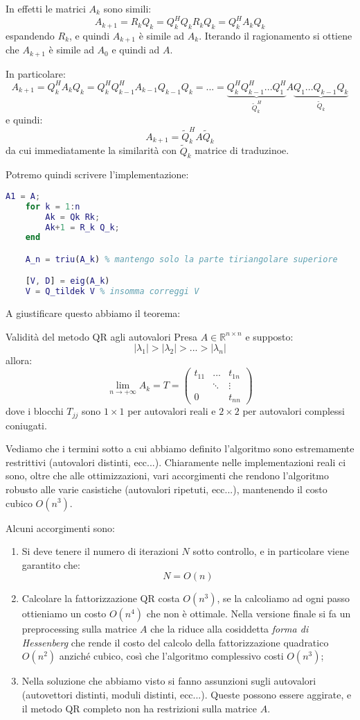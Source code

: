 \documentclass[a4paper,11pt]{article}
\begin{document}
In effetti le matrici $A_k$ sono simili:
$$
A_{k + 1} = R_k Q_k = Q_k^H Q_k R_k Q_k = Q_k^H A_k Q_k
$$
espandendo $R_k$, e quindi $A_{k + 1}$ è simile ad $A_k$.
Iterando il ragionamento si ottiene che $A_{k + 1}$ è simile ad $A_0$ e quindi ad $A$.

In particolare:
$$
A_{k + 1} = Q_k^H A_k Q_k = Q_k^H Q_{k - 1}^H A_{k - 1} Q_{k - 1} Q_k
= ... = \underbrace{ Q_k^H Q_{k - 1}^H ... Q_1^H }_{\tilde{Q}_k^H} A \underbrace{ Q_1 ... Q_{k - 1} Q_k }_{\tilde{Q}_k}
$$
e quindi:
$$
A_{k + 1} = \tilde{Q}_k^H A \tilde{Q}_k
$$
da cui immediatamente la similarità con $\tilde{Q}_k$ matrice di traduzinoe.

Potremo quindi scrivere l'implementazione: %
\begin{lstlisting}[language=matlab, style=codestyle]	
	A1 = A;
	for k = 1:n
		Ak = Qk Rk;
		Ak+1 = R_k Q_k;
	end

	A_n = triu(A_k) % mantengo solo la parte tiriangolare superiore

	[V, D] = eig(A_k)
	V = Q_tildek V % insomma correggi V
\end{lstlisting}

A giustificare questo abbiamo il teorema:
\begin{theorem}{Validità del metodo QR agli autovalori}
	Presa $A \in \mathbb{R}^{n \times n}$ e supposto:
	$$
	|\lambda_1| > |\lambda_2| > ... > |\lambda_n|
	$$
	allora:
	$$
	\lim_{n \rightarrow +\infty} A_k = T = 
\begin{pmatrix}
	t_{11} & ... & t_{1n} \\ 
				 & \ddots & \vdots \\
	0 & & t_{nn}
\end{pmatrix}
	$$
	dove i blocchi $T_{jj}$ sono $1 \times 1$ per autovalori reali e $2 \times 2$ per autovalori complessi coniugati.
\end{theorem}

Vediamo che i termini sotto a cui abbiamo definito l'algoritmo sono estremamente restrittivi (autovalori distinti, ecc...).
Chiaramente nelle implementazioni reali ci sono, oltre che alle ottimizzazioni, vari accorgimenti che rendono l'algoritmo robusto alle varie casistiche (autovalori ripetuti, ecc...), mantenendo il costo cubico $O(n^3)$.

Alcuni accorgimenti sono:
\begin{enumerate}
	\item Si deve tenere il numero di iterazioni $N$ sotto controllo, e in particolare viene garantito che:
		$$
		N = O(n)
		$$
	\item Calcolare la fattorizzazione QR costa $O(n^3)$, se la calcoliamo ad ogni passo ottieniamo un costo $O(n^4)$ che non è ottimale.
		Nella versione finale si fa un preprocessing sulla matrice $A$ che la riduce alla cosiddetta \textit{forma di Hessenberg} che rende il costo del calcolo della fattorizzazione quadratico $O(n^2)$ anziché cubico, così che l'algoritmo complessivo costi $O(n^3)$;
	\item Nella soluzione che abbiamo visto si fanno assunzioni sugli autovalori (autovettori distinti, moduli distinti, ecc...). Queste possono essere aggirate, e il metodo QR completo non ha restrizioni sulla matrice $A$.
\end{enumerate}
\end{document}
